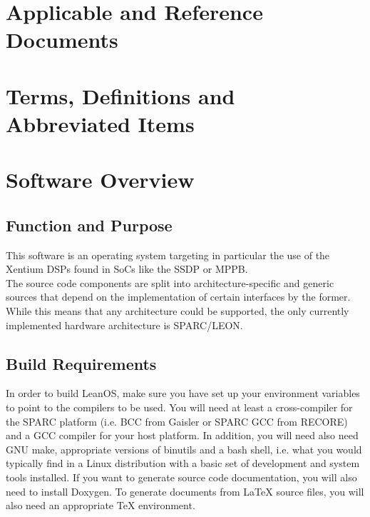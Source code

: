 \chapter{Applicable and Reference Documents} %

\printbibliography[heading=none]


\chapter{Terms, Definitions and Abbreviated Items}
\printglossary[type=acronym]
\printglossary[type=main, style=altlist]



\chapter{Software Overview}

\section{Function and Purpose}

This software is an operating system targeting in particular the use of the
Xentium DSPs found in \glspl{SoC} like the \gls{SSDP} or \gls{MPPB}.
\\

The source code components are split into architecture-specific and generic
sources that depend on the implementation of certain interfaces by the former.
While this means that any architecture could be supported, the only
currently implemented hardware architecture is SPARC/LEON.


\section {Build Requirements}

In order to build LeanOS, make sure you have set up your environment variables
to point to the compilers to be used. You will need at least a cross-compiler
for the \gls{SPARC} platform (i.e. BCC from Gaisler or SPARC GCC from RECORE)
and a \gls{GCC} compiler for your host platform. In addition, you will need
also need GNU make, appropriate versions of binutils and a bash shell, i.e.
what you would typically find in a Linux distribution with a basic set of
development and system tools installed. If you want to generate source code
documentation, you will also need to install \gls{Doxygen}. To generate
documents from LaTeX source files, you will also need an appropriate TeX
environment.


